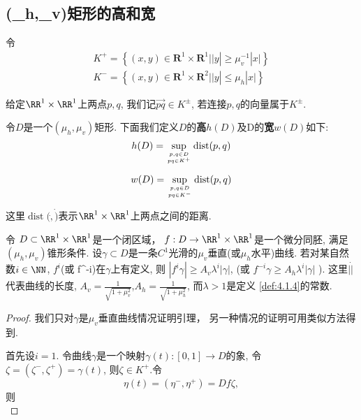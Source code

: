 \subsection{(\mu_h,\mu_v)矩形的高和宽}
令
$$
\begin{array}{l}{K^{+}=\left\{(x, y) \in \mathbf{R}^{1} \times \mathbf{R}^{1}| | y\left|\geqslant \mu_{v}^{-1}\right| x |\right\}} \\ {K^{-}=\left\{(x, y) \in \mathbf{R}^{1} \times \mathbf{R}^{2}| | y\left| \leqslant \mu_{h}\right| x |\right\}}\end{array}
$$

给定$\RR^1\times \RR^1$上两点$p,q$,
我们记$\overrightarrow{p q} \in K^{\pm}$,
若连接$p,q$的向量属于$K^{\pm}$.
\par
令$D$是一个$(\mu_h,\mu_v)$矩形.
下面我们定义$D$的\textbf{高}$h(D)$及D的\textbf{宽}$w(D)$如下:
$$
h(D)=\sup _{p, q \in D \atop p q \in K^{+}} \operatorname{dist}(p, q)
$$

$$
w(D)=\sup _{p, q \in D \atop p q \in K^{-}} \operatorname{dist}(p, q)
$$

这里$\operatorname{dist}(\dot,\dot)$表示$\RR^1\times \RR^1$上两点之间的距离.

\begin{corollary}
  \label{cor:4.1.10}
令 $D \subset \RR^1 \times \RR^1$是一个闭区域，
$f:D \to \RR^1 \times \RR^1$是一个微分同胚,
满足$(\mu_h,\mu_v)$锥形条件.
设$\gamma \subset D$是一条$C^1$光滑的$\mu_v$垂直(或$\mu_h$水平)曲线.
若对某自然数$i \in \NN$,
$f^i$(或 f^{-i})在$\gamma$上有定义,
则
$ |f^i\gamma| \geqslant A_v \lambda^i |\gamma|$,
(或 $f^{-i} \gamma \geqslant A_h \lambda^i |\gamma|$ ).
这里$|\dot|$代表曲线的长度,
$A_v=\frac{1}{\sqrt{1+\mu_v^2}}$,$A_h=\frac{1}{\sqrt{1+\mu_h^2}}$,
而$\lambda>1$是定义 \ref{def:4.1.4}的常数.
\end{corollary}
\begin{proof}
我们只对$\gamma$是$\mu_v$垂直曲线情况证明引理，
另一种情况的证明可用类似方法得到.
\par
首先设$i=1$.
令曲线$\gamma$是一个映射$\gamma(t):[0,1] \to D$的象,
令$\zeta=(\zeta^-,\zeta^+)=\gamma(t)$,
则$\zeta \in K^+$.令
$$\eta(t) =(\eta^-,\eta^+)=Df\zeta, $$
则
\begin{equation}

\end{equation}

\end{proof}